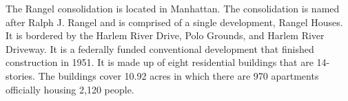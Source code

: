 The Rangel consolidation is located in Manhattan. The consolidation is named after Ralph J. Rangel and is comprised of a single development, Rangel Houses. It is bordered by the Harlem River Drive, Polo Grounds, and Harlem River Driveway. It is a federally funded conventional development that finished construction in 1951. It is made up of eight residential buildings that are 14-stories. The buildings cover 10.92 acres in which there are 970 apartments officially housing 2,120 people.